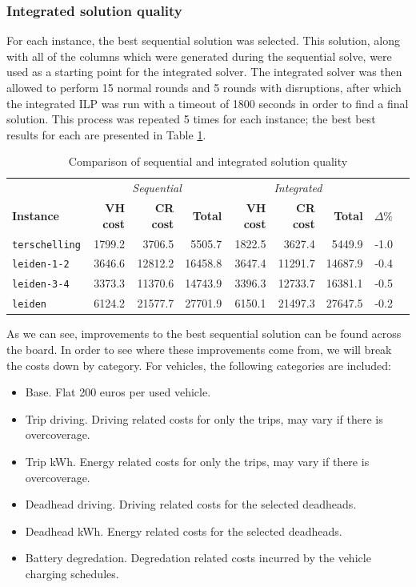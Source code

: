 \documentclass[]{article}
\begin{document}
\subsubsection{Integrated solution quality}
For each instance, the best sequential solution was selected. This solution, along with all of the columns which were generated during the sequential solve, were used as a starting point for the integrated solver. The integrated solver was then allowed to perform 15 normal rounds and 5 rounds with disruptions, after which the integrated ILP was run with a timeout of 1800 seconds in order to find a final solution. This process was repeated 5 times for each instance; the best best results for each are presented in Table \ref{tab:seq-vs-int}.
\begin{table}[h]
  \centering
  \begin{tabular}{lrrrrrrrr}
    \toprule
       & \multicolumn{3}{c}{\textit{Sequential}} & \multicolumn{3}{c}{\textit{Integrated}} & \\
       \textbf{Instance} & \textbf{VH cost} & \textbf{CR cost} & \textbf{Total} & \textbf{VH cost} & \textbf{CR cost} & \textbf{Total} & $\Delta\%$ \\
       \cmidrule(lr){1-1} \cmidrule(lr){2-4} \cmidrule(lr){5-7} \cmidrule(lr){8-8}
        \texttt{terschelling}   & 1799.2 & 3706.5 & 5505.7 & 1822.5 & 3627.4 & 5449.9 & -1.0 \\
        \texttt{leiden-1-2}   & 3646.6 & 12812.2 & 16458.8 & 3647.4 & 11291.7 & 14687.9 & -0.4 \\
        \texttt{leiden-3-4}   & 3373.3 & 11370.6 & 14743.9 & 3396.3 & 12733.7 & 16381.1 & -0.5 \\
        \texttt{leiden}   & 6124.2 & 21577.7 & 27701.9 & 6150.1 & 21497.3 & 27647.5 & -0.2   \\
        \bottomrule
  \end{tabular}
  \caption{Comparison of sequential and integrated solution quality}
  \label{tab:seq-vs-int}
\end{table}

As we can see, improvements to the best sequential solution can be found across the board. In order to see where these improvements come from, we will break the costs down by category. For vehicles, the following categories are included: 
\begin{itemize}
  \item Base. Flat 200 euros per used vehicle. 
  \item Trip driving. Driving related costs for only the trips, may vary if there is overcoverage.   
  \item Trip kWh. Energy related costs for only the trips, may vary if there is overcoverage.
  \item Deadhead driving. Driving related costs for the selected deadheads.
  \item Deadhead kWh. Energy related costs for the selected deadheads.
  \item Battery degredation. Degredation related costs incurred by the vehicle charging schedules. 
\end{itemize}
\end{document}

